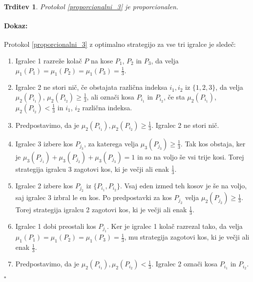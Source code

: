 \documentclass[a4paper, 12pt]{article}
\newtheorem{trditev}{Trditev}
\newenvironment{dokaz}{\paragraph{Dokaz:}}{\hfill$\square$\\}
\begin{document}
	\begin{trditev}
		Protokol \ref{proporcionalni_3} je proporcionalen.
	\end{trditev}

	\begin{dokaz}
		Protokol \ref{proporcionalni_3} z optimalno strategijo za vse tri igralce je sledeč:
		\begin{enumerate}
			
			\item Igralec 1 razreže kolač $P$ na kose $P_1$, $P_2$ in $P_3$, da velja $\mu_1 (P_1) = \mu_1 (P_2) = \mu_1 (P_3) = \frac{1}{3}$.
			
			\item Igralec 2 ne stori nič, če obstajata različna indeksa $i_1, i_2$ iz $\{1, 2, 3\}$, da velja $\mu_2 (P_{i_1})$, $\mu_2 (P_{i_2}) \geq \frac{1}{3}$, ali označi kosa $P_{i_1}$ in $P_{i_2}$, če sta $\mu_2 (P_{i_1})$, $\mu_2 (P_{i_2}) < \frac{1}{3}$ in $i_1$, $i_2$ različna indeksa.
			
			\item[] Predpostavimo, da je $\mu_2 (P_{i_1}), \mu_2 (P_{i_2}) \geq \frac{1}{3}$. Igralec 2 ne stori nič.
			
			\setcounter{enumi}{2}
			
			\item \qquad Igralec 3 izbere kos $P_{j_3}$, za katerega velja $\mu_3 (P_{j_3}) \geq \frac{1}{3}$. Tak kos obstaja, ker je $\mu_3 (P_{j_1}) + \mu_3 (P_{j_2}) + \mu_3 (P_{j_3}) = 1$ in so na voljo še vsi trije kosi. Torej strategija igralcu 3 zagotovi kos, ki je večji ali enak $\frac{1}{3}$.
			
			\item \qquad Igralec 2 izbere kos $P_{j_2}$ iz $\{P_{i_1}, P_{i_2}\}$. Vsaj eden izmed teh kosov je še na voljo, saj igralec 3 izbral le en kos. Po predpostavki za kos $P_{j_2}$ velja $\mu_2 (P_{j_2}) \geq \frac{1}{3}$. Torej strategija igralcu 2 zagotovi kos, ki je večji ali enak $\frac{1}{3}$.
			
			\item \qquad Igralec 1 dobi preostali kos $P_{j_1}$. Ker je igralec 1 kolač razrezal tako, da velja $\mu_1 (P_1) = \mu_1 (P_2) = \mu_1 (P_3) = \frac{1}{3}$, mu strategija zagotovi kos, ki je večji ali enak $\frac{1}{3}$. 
			
			\item[] Predpostavimo, da je $\mu_2 (P_{i_1}), \mu_2 (P_{i_2}) < \frac{1}{3}$. Igralec 2 označi kosa $P_{i_1}$ in $P_{i_2}$. 
			
			\setcounter{enumi}{2}
			

\end{enumerate}
\end{dokaz}
\end{document}
